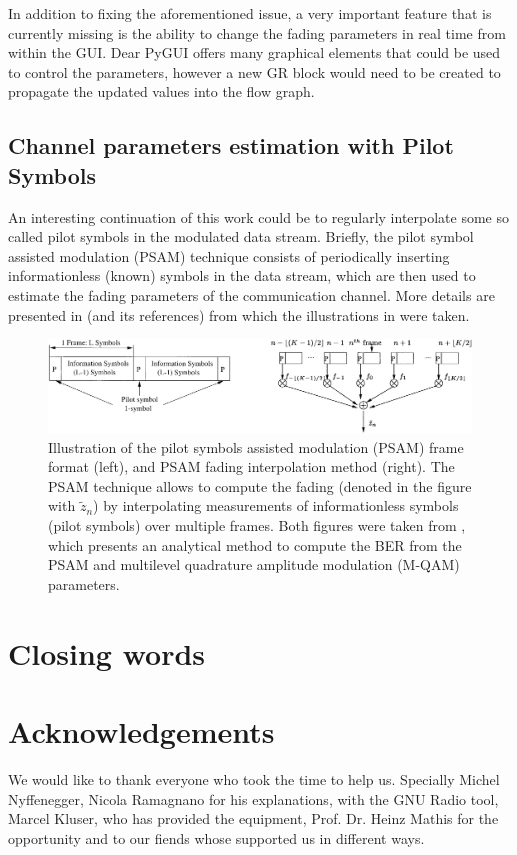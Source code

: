 In addition to fixing the aforementioned issue, a very important feature that is currently missing is the ability to change the fading parameters in real time from within the GUI. Dear PyGUI offers many graphical elements that could be used to control the parameters, however a new GR block would need to be created to propagate the updated values into the flow graph.

\subsection{Channel parameters estimation with Pilot Symbols}

An interesting continuation of this work could be to regularly interpolate some so called pilot symbols in the modulated data stream. Briefly, the pilot symbol assisted modulation (PSAM) technique consists of periodically inserting informationless (known) symbols in the data stream, which are then used to estimate the fading parameters of the communication channel. More details are presented in \cite{Xiaoyi1999} (and its references) from which the illustrations in  were taken.

\begin{figure}
	\centering
	\includegraphics[width = \linewidth]{figures/xiaoyi-psam-figures}
	\caption{
		Illustration of the pilot symbols assisted modulation (PSAM) frame format (left), and PSAM fading interpolation method (right). The PSAM technique allows to compute the fading (denoted in the figure with \(\tilde{z}_n\)) by interpolating measurements of informationless symbols (pilot symbols) over multiple frames. Both figures were taken from \cite{Xiaoyi1999}, which presents an analytical method to compute the BER from the PSAM and multilevel quadrature amplitude modulation (M-QAM) parameters.
		\label{fig:psam}
	}
\end{figure}

\section{Closing words}

\section{Acknowledgements}


We would like to thank everyone who took the time to help us. Specially Michel Nyffenegger, Nicola Ramagnano for his explanations, with the GNU Radio tool,
Marcel Kluser, who has provided the equipment, Prof. Dr. Heinz Mathis for the opportunity and to our fiends whose supported us in different ways.



